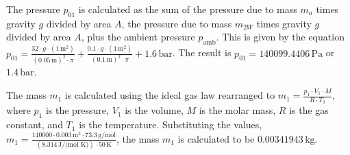 The pressure \( p_{01} \) is calculated as the sum of the pressure due to mass \( m_a \) times gravity \( g \) divided by area \( A \), the pressure due to mass \( m_{2W} \) times gravity \( g \) divided by area \( A \), plus the ambient pressure \( p_{\text{amb}} \). This is given by the equation \( p_{01} = \frac{32 \cdot g \cdot (1 \, \text{m}^2)}{(0.05 \, \text{m})^2 \cdot \pi} + \frac{0.1 \cdot g \cdot (1 \, \text{m}^2)}{(0.1 \, \text{m})^2 \cdot \pi} + 1.6 \, \text{bar} \). The result is \( p_{01} = 140099.4406 \, \text{Pa} \) or \( 1.4 \, \text{bar} \).

The mass \( m_1 \) is calculated using the ideal gas law rearranged to \( m_1 = \frac{p_1 \cdot V_1 \cdot M}{R \cdot T_1} \), where \( p_1 \) is the pressure, \( V_1 \) is the volume, \( M \) is the molar mass, \( R \) is the gas constant, and \( T_1 \) is the temperature. Substituting the values, \( m_1 = \frac{140000 \cdot 0.003 \, \text{m}^3 \cdot 73.3 \, \text{g/mol}}{(8.314 \, \text{J/(mol K)}) \cdot 50 \, \text{K}} \), the mass \( m_1 \) is calculated to be \( 0.00341943 \, \text{kg} \).